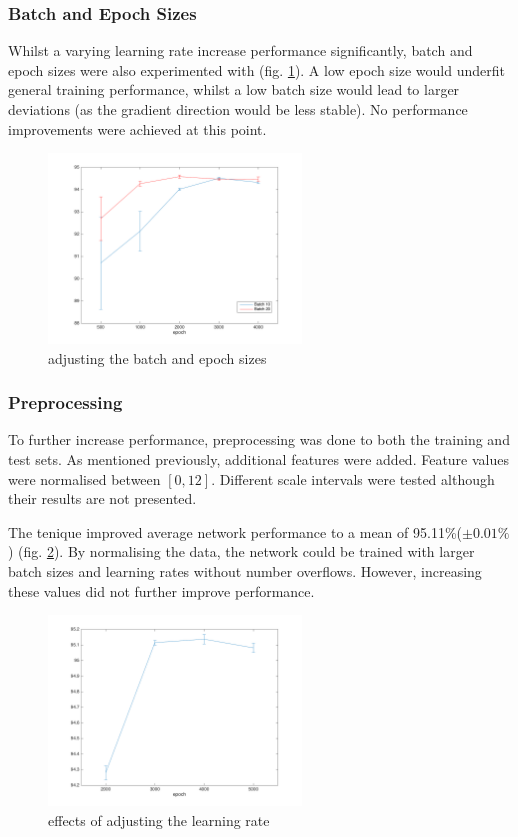 \documentclass[11]{article}
\begin{document}
\subsubsection{Batch and Epoch Sizes}
Whilst a varying learning rate increase performance significantly, batch and epoch sizes were also experimented with (fig. \ref{fig:batchandepoch}). A low epoch size would underfit general training performance, whilst a low batch size would lead to larger deviations (as the gradient direction would be less stable). No performance improvements were achieved at this point. 

\begin{figure}[h]
\centering
\includegraphics[width=0.6\textwidth]{batchandepoch.png}
\caption{adjusting the batch and epoch sizes}
\label{fig:batchandepoch}
\end{figure}

\subsubsection{Preprocessing}
To further increase performance, preprocessing was done to both the training and test sets. As mentioned previously, additional features were added. Feature values were normalised between $[0,12]$. Different scale intervals were tested although their results are not presented. 

The tenique improved average network performance to a mean of 95.11\%($\pm 0.01\%$) (fig. \ref{fig:normalised}). By normalising the data, the network could be trained with larger batch sizes and learning rates without number overflows. However, increasing these values did not further improve performance. 

\begin{figure}[h]
\centering
\includegraphics[width=0.6\textwidth]{normalised.png}
\caption{effects of adjusting the learning rate}
\label{fig:normalised}
\end{figure}
\end{document}
